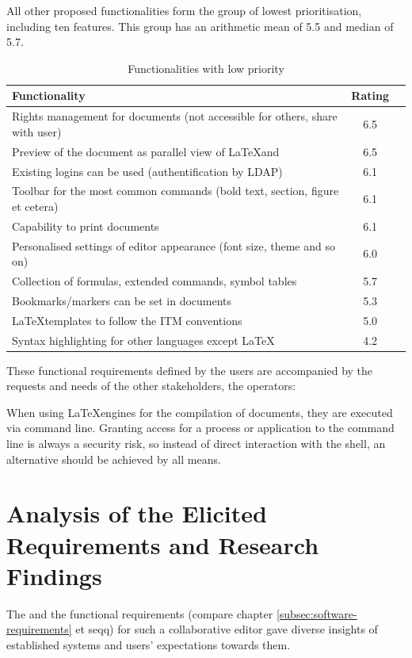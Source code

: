All other proposed functionalities form the group of lowest prioritisation, including ten features. This group has an arithmetic mean of 5.5 and median of 5.7.

\begin{table}[H]
	\begin{center}
		\footnotesize
		\setlength\extrarowheight{5pt}
		\begin{tabular}{ p{11cm} cp{1.5cm} }
		  	\textbf{Functionality} 	  														& \textbf{Rating} \\
			\hline
			Rights management for documents (not accessible for others, share with user)	& 6.5 \\
			Preview of the document as parallel view of \LaTeX and \fileformat{PDF}			& 6.5 \\
			Existing logins can be used (authentification by LDAP)							& 6.1 \\
			Toolbar for the most common commands (bold text, section, figure et cetera)		& 6.1 \\
 			Capability to print documents													& 6.1 \\
			Personalised settings of editor appearance (font size, theme and so on)			& 6.0 \\
			Collection of formulas, extended commands, symbol tables						& 5.7 \\
			Bookmarks/markers can be set in documents				 						& 5.3 \\
			\LaTeX templates to follow the ITM conventions									& 5.0 \\
			Syntax highlighting for other languages except \LaTeX							& 4.2 \\
		\end{tabular}
		\caption{Functionalities with low priority}
		\label{tab:low-priority}
	\end{center}
\end{table}

These functional requirements defined by the users are accompanied by the requests and needs of the other stakeholders, the operators: 

When using \LaTeX engines for the compilation of documents, they are executed via command line. Granting access for a process or application to the command line is always a security risk, so instead of direct interaction with the shell, an alternative should be achieved by all means.

\section{Analysis of the Elicited Requirements and Research Findings}
The  and the functional requirements (compare chapter \ref{subsec:software-requirements} et seqq) for such a  collaborative editor gave diverse insights of established systems and users' expectations towards them. 

